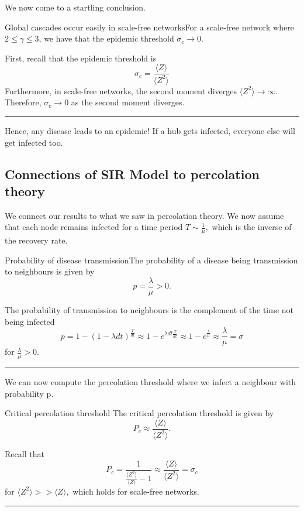 \documentclass[twoside]{article}
\newenvironment{proof}{{\bf Proof:}}{\hfill\rule{2mm}{2mm}}
\begin{document}
We now come to a startling conclusion.

\begin{proposition_exam}{Global cascades occur easily in scale-free networks}{}For a scale-free network where $2 \leq \gamma \leq 3$, we have that the epidemic threshold $\sigma_c \rightarrow 0$.
\end{proposition_exam}
\begin{proof} First, recall that the epidemic threshold is 
$$
\sigma_c = \frac{\langle Z \rangle}{\langle Z^2 \rangle}
$$
Furthermore, in scale-free networks, the second moment diverges $\langle Z^2 \rangle \rightarrow \infty.$ Therefore, $\sigma_c \rightarrow 0$ as the second moment diverges.
\end{proof}

Hence, any disease leads to an epidemic! If a hub gets infected, everyone else will get infected too.

\subsection{Connections of SIR Model to percolation theory}

We connect our results to what we saw in percolation theory. We now assume that each node remains infected for a time period $T \sim \frac{1}{\mu},$ which is the inverse of the recovery rate.

\begin{proposition_exam}{Probability of disease transmission}{}The probability of a disease being transmission to neighbours is given by 
$$
p = \frac{\lambda}{\mu} > 0.
$$
\end{proposition_exam}
\begin{proof}  The probability of transmission to neighbours is the complement of the time not being infected 
$$
p = 1 - (1 - \lambda dt)^{\frac{T}{dt}} \approx 1 - e^{\lambda dt \frac{T}{dt}} \approx 1 - e^{\frac{\lambda}{\mu}} \approx \frac{\lambda}{\mu} = \sigma
$$
for $\frac{\lambda}{\mu} > 0.$
\end{proof}

We can now compute the percolation threshold where we infect a neighbour with probability p.


\begin{theorem_exam}{Critical percolation threshold}{} The critical percolation threshold is given by 
$$
P_c \approx \frac{\langle Z \rangle}{\langle Z^2 \rangle}.
$$
\end{theorem_exam}
\begin{proof} Recall that 
$$
P_c = \frac{1}{\frac{\langle Z^2 \rangle}{\langle Z \rangle} - 1} \approx \frac{\langle Z \rangle}{\langle Z^2 \rangle} = \sigma_c
$$
for $\langle Z^2 \rangle >> \langle Z \rangle,$ which holds for scale-free networks.
\end{proof}
\end{document}
